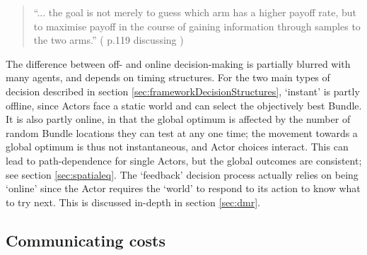 \begin{quote}
``... the goal is not merely to guess which arm has a higher payoff rate, but to maximise payoff in the course of gaining information through samples to the two arms.'' (\citealt{mitchell_introduction_1998} p.119 discussing \citealt{holland_adaptation_1975})
\end{quote}

The difference between off- and online decision-making is partially blurred with many agents, and depends on timing structures. For the two main types of decision described in section \ref{sec:frameworkDecisionStructures}, `instant' is partly offline, since Actors face a static world and can select the objectively best Bundle. It is also partly online, in that the global optimum is affected by the number of random Bundle locations they can test at any one time; the movement towards a global optimum is thus not instantaneous, and Actor choices interact. This can lead to path-dependence for single Actors, but the global outcomes are consistent; see section \ref{sec:spatialeq}. The `feedback' decision process actually relies on being `online' since the Actor requires the `world' to respond to its action to know what to try next. This is discussed in-depth in section \ref{sec:dmr}.


\subsection{Communicating costs \label{sec:comm_costs}}

